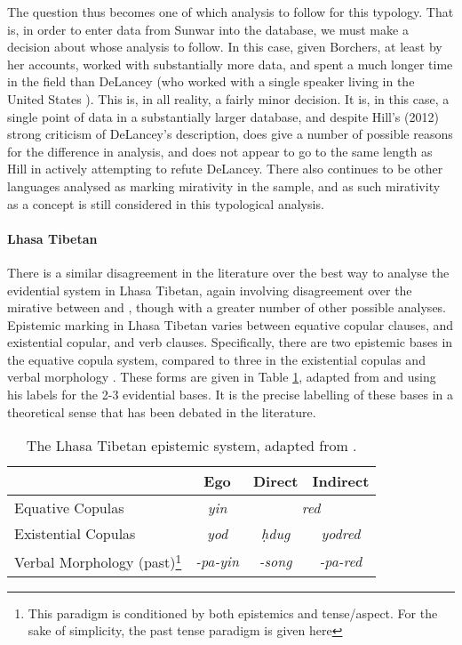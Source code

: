The question thus becomes one of which analysis to follow for this typology. That is, in order to enter data from Sunwar into the database, we must make a decision about whose analysis to follow. In this case, given Borchers, at least by her accounts, worked with substantially more data, and spent a much longer time in the field than DeLancey (who worked with a single speaker living in the United States \cite{DeLanceyMirativity1997}). This is, in all reality, a fairly minor decision. It is, in this case, a single point of data in a substantially larger database, and despite Hill's (2012) strong criticism of DeLancey's description,  does give a number of possible reasons for the difference in analysis, and does not appear to go to the same length as Hill in actively attempting to refute DeLancey. There also continues to be other languages analysed as marking mirativity in the sample, and as such mirativity as a concept is still considered in this typological analysis.

\paragraph{Lhasa Tibetan}
There is a similar disagreement in the literature over the best way to analyse the evidential system in Lhasa Tibetan, again involving disagreement over the mirative between  and , though with a greater number of other possible analyses. Epistemic marking in Lhasa Tibetan varies between equative copular clauses, and existential copular, and verb clauses. Specifically, there are two epistemic bases in the equative copula system, compared to three in the existential copulas and verbal morphology \cite{DeLancey2017Tibetan}. These forms are given in Table \ref{t:Description:LhasaEpistemics}, adapted from  and using his labels for the 2-3 evidential bases. It is the precise labelling of these bases in a theoretical sense that has been debated in the literature.

\begin{table}
        \begin{tabular}{l|c|c|c}
         & Ego & Direct & Indirect \\ \hline
        Equative Copulas & \textit{yin} & \multicolumn{2}{c}{\textit{red}} \\
        Existential Copulas & \textit{yod} & \textit{ḥdug} & \textit{yodred} \\
        Verbal Morphology (past)\footnote{This paradigm is conditioned by both epistemics and tense/aspect. For the sake of simplicity, the past tense paradigm is given here} & \textit{-pa-yin} & \textit{-song} & \textit{-pa-red}
        \end{tabular}
        \caption{The Lhasa Tibetan epistemic system, adapted from .}\label{t:Description:LhasaEpistemics}
 \end{table}

